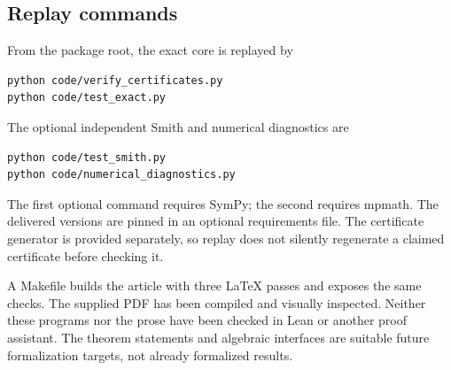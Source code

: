 \subsection{Replay commands}
From the package root, the exact core is replayed by
\begin{verbatim}
python code/verify_certificates.py
python code/test_exact.py
\end{verbatim}
The optional independent Smith and numerical diagnostics are
\begin{verbatim}
python code/test_smith.py
python code/numerical_diagnostics.py
\end{verbatim}
The first optional command requires SymPy; the second requires mpmath.
The delivered versions are pinned in an optional requirements file.
The certificate generator is provided separately, so replay does not
silently regenerate a claimed certificate before checking it.

A Makefile builds the article with three LaTeX passes and exposes the
same checks. The supplied PDF has been compiled and visually inspected.
Neither these programs nor the prose have been checked in Lean or another
proof assistant. The theorem statements and algebraic interfaces are
suitable future formalization targets, not already formalized results.
